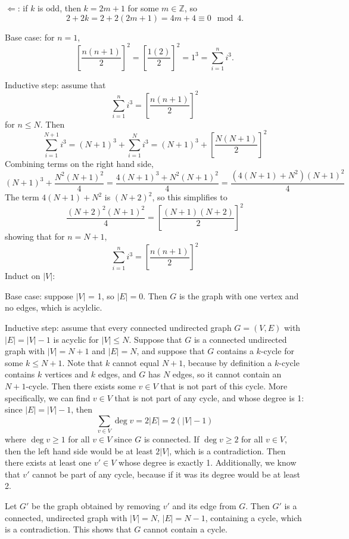 \documentclass[12pt,twoside]{article}
\begin{document}
\begin{problems}
\begin{problemparts}
$\Leftarrow$: if $k$ is odd, then $k = 2m + 1$ for some $m \in \mathbb{Z}$, so 
$$
2 + 2k = 2 + 2(2m + 1) = 4m + 4 \equiv 0 \mod 4.
$$
\end{problemparts}

\problem  %

Base case: for $n = 1$,
$$
\left[\frac{n(n + 1)}{2}\right]^2 = \left[\frac{1(2)}{2}\right]^2 = 1^3 = \sum_{i = 1}^n i^3.
$$

Inductive step: assume that
$$
\sum_{i = 1}^n i^3 = \left[\frac{n(n + 1)}{2}\right]^2
$$
for $n \leq N$. Then
$$
\sum_{i = 1}^{N + 1} i^3 = (N + 1)^3 + \sum_{i = 1}^N i^3 = (N + 1)^3 + \left[\frac{N(N + 1)}{2}\right]^2
$$
Combining terms on the right hand side,
$$
(N + 1)^3 + \frac{N^2(N + 1)^2}{4} = \frac{4(N + 1)^3 + N^2(N + 1)^2}{4} = \frac{(4(N + 1) + N^2)(N + 1)^2}{4}
$$
The term $4(N + 1) + N^2$ is $(N + 2)^2$, so this simplifies to
$$
\frac{(N + 2)^2(N + 1)^2}{4} = \left[\frac{(N + 1)(N + 2)}{2}\right]^2
$$
showing that for $n = N + 1$,
$$
\sum_{i = 1}^n i^3 = \left[\frac{n(n + 1)}{2}\right]^2
$$
\newpage
\problem  Induct on $|V|$:

Base case: suppose $|V|$ = 1, so $|E| = 0$. Then $G$ is the graph with one vertex and no edges, which is acylclic.

Inductive step: assume that every connected undirected graph $G = (V, E)$ with $|E| = |V| - 1$ is acyclic for $|V| \leq N$. Suppose that $G$ is a connected undirected graph with $|V| = N + 1$ and $|E| = N$, and suppose that $G$ contains a $k$-cycle for some $k \leq N + 1$. Note that $k$ cannot equal $N + 1$, because by definition a $k$-cycle contains $k$ vertices and $k$ edges, and $G$ has $N$ edges, so it cannot contain an $N + 1$-cycle. Then there exists some $v \in V$ that is not part of this cycle. More specifically, we can find $v \in V$ that is not part of any cycle, and whose degree is 1: since $|E| = |V| - 1$, then
$$
\sum_{v \in V} \deg v = 2 |E| = 2(|V| - 1)
$$
where $\deg v \geq 1$ for all $v \in V$ since $G$ is connected. If $\deg v \geq 2$ for all $v \in V$, then the left hand side would be at least $2|V|$, which is a contradiction. Then there exists at least one $v' \in V$ whose degree is exactly 1. Additionally, we know that $v'$ cannot be part of any cycle, because if it was its degree would be at least 2.

Let $G'$ be the graph obtained by removing $v'$ and its edge from $G$. Then $G'$ is a connected, undirected graph with $|V| = N$, $|E| = N - 1$, containing a cycle, which is a contradiction. This shows that $G$ cannot contain a cycle.


\end{problems}
\end{document}

